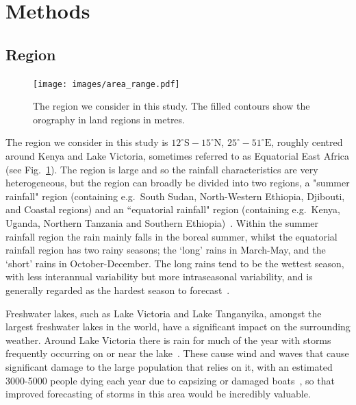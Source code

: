 \documentclass{article}
\begin{document}
\section{Methods}
\subsection{Region}


\begin{figure}[t]
    \centering
    \texttt{[image: images/area\_range.pdf]}
    
    \caption{The region we consider in this study. The filled contours show the orography in land regions in metres.}
    \label{fig:region}
\end{figure}

The region we consider in this study is $12^{\circ}\text{S}-15^{\circ}\text{N}$, $25^{\circ}-51^{\circ}\text{E}$, roughly centred around Kenya and Lake Victoria, sometimes referred to as Equatorial East Africa (see Fig.~\ref{fig:region}). The region is large and so the rainfall characteristics are very heterogeneous, but the region can broadly be divided into two regions, a "summer rainfall" region (containing e.g.~South Sudan, North-Western Ethiopia, Djibouti, and Coastal regions) and an ``equatorial rainfall" region (containing e.g.~Kenya, Uganda, Northern Tanzania and Southern Ethiopia)~\citep{nicholson_climate_2017}. Within the summer rainfall region the rain mainly falls in the boreal summer, whilst the equatorial rainfall region has two rainy seasons; the `long' rains in March-May, and the `short' rains in October-December. The long rains tend to be the wettest season, with less interannual variability but more intraseasonal variability, and is generally regarded as the hardest season to forecast~\citep{nicholson_climate_2017, walker_skill_2019, kilavi_extreme_2018}.

Freshwater lakes, such as Lake Victoria and Lake Tanganyika, amongst the largest freshwater lakes in the world, have a significant impact on the surrounding weather. Around Lake Victoria there is rain for much of the year with storms frequently occurring on or near the lake~\citep{macleod_drivers_2021, chamberlain_forecasting_2014, woodhams_identifying_2019}. These cause wind and waves that cause significant damage to the large population that relies on it, with an estimated 3000-5000 people dying each year due to capsizing or damaged boats~\citep{ifrc_world_2014}, so that improved forecasting of storms in this area would be incredibly valuable. 
\end{document}
